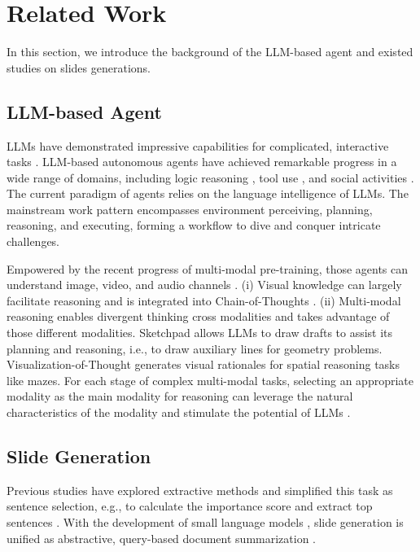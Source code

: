 \section{Related Work}
In this section, we introduce the background of the LLM-based agent and existed studies on slides generations.
\subsection{LLM-based Agent}
LLMs have demonstrated impressive capabilities for complicated, interactive tasks \cite{yao2023react, yao2022webshop, xi2024agentgym, yang2024swe, ma2024coco}. LLM-based autonomous agents have achieved remarkable progress in a wide range of domains, including logic reasoning \cite{qi2024mutual, khattab2022demonstrate}, tool use \cite{qin2024toolllm, zhang2023igniting}, and social activities \cite{Park2023GenerativeAgents}. 
The current paradigm of agents relies on the language intelligence of LLMs.
The mainstream work pattern encompasses environment perceiving, planning, reasoning, and executing, forming a workflow to dive and conquer intricate challenges.

Empowered by the recent progress of multi-modal pre-training, those agents can understand image, video, and audio channels \cite{wu2023nextgpt, liu2023llava}.
(i) Visual knowledge can largely facilitate reasoning and is integrated into Chain-of-Thoughts  \cite{zhang2023multicot, xu2024llavacot}. 
(ii) Multi-modal reasoning enables divergent thinking cross modalities and takes advantage of those different modalities. 
Sketchpad \cite{hu2024visual} allows LLMs to draw drafts to assist its planning and reasoning, i.e., to draw auxiliary lines for geometry problems.
Visualization-of-Thought \cite{wu2024minds} generates visual rationales for spatial reasoning tasks like mazes.
For each stage of complex multi-modal tasks, selecting an appropriate modality as the main modality for reasoning can leverage the natural characteristics of the modality and stimulate the potential of LLMs \cite{park2025generalizingsimplehardvisual}.

\subsection{Slide Generation} 
Previous studies have explored extractive methods and simplified this task as sentence selection, e.g., to calculate the importance score and extract top sentences \cite{Wang2017PhraseBasedPS}. With the development of small language models \cite{lewis-etal-2020-bart, 2020t5}, slide generation is unified as abstractive, query-based document summarization \cite{sun-etal-2021-d2s}. 

